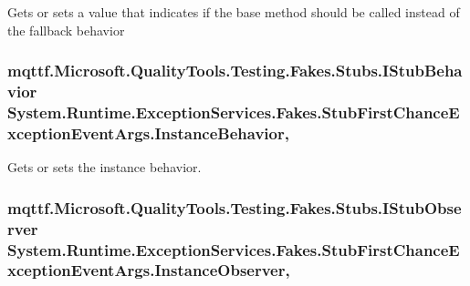 Gets or sets a value that indicates if the base method should be called instead of the fallback behavior

\hypertarget{class_system_1_1_runtime_1_1_exception_services_1_1_fakes_1_1_stub_first_chance_exception_event_args_a4993d454495c1ce8cc1553329a80da7f}{
\subsubsection[{Instance\-Behavior}]{\setlength{\rightskip}{0pt plus 5cm}mqttf.\-Microsoft.\-Quality\-Tools.\-Testing.\-Fakes.\-Stubs.\-I\-Stub\-Behavior System.\-Runtime.\-Exception\-Services.\-Fakes.\-Stub\-First\-Chance\-Exception\-Event\-Args.\-Instance\-Behavior\hspace{0.3cm}{\ttfamily [get]}, {\ttfamily [set]}}}\label{class_system_1_1_runtime_1_1_exception_services_1_1_fakes_1_1_stub_first_chance_exception_event_args_a4993d454495c1ce8cc1553329a80da7f}


Gets or sets the instance behavior.

\hypertarget{class_system_1_1_runtime_1_1_exception_services_1_1_fakes_1_1_stub_first_chance_exception_event_args_adb885e5b1a10612c0d513274a429cbf9}{
\subsubsection[{Instance\-Observer}]{\setlength{\rightskip}{0pt plus 5cm}mqttf.\-Microsoft.\-Quality\-Tools.\-Testing.\-Fakes.\-Stubs.\-I\-Stub\-Observer System.\-Runtime.\-Exception\-Services.\-Fakes.\-Stub\-First\-Chance\-Exception\-Event\-Args.\-Instance\-Observer\hspace{0.3cm}{\ttfamily [get]}, {\ttfamily [set]}}}\label{class_system_1_1_runtime_1_1_exception_services_1_1_fakes_1_1_stub_first_chance_exception_event_args_adb885e5b1a10612c0d513274a429cbf9}


